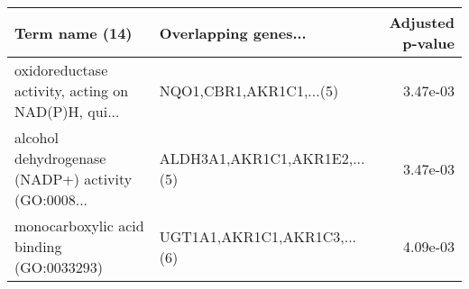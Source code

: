 \begin{tabular}{llr}
\toprule
                                    Term name (14) &         Overlapping genes... &  Adjusted p-value \\
\midrule
oxidoreductase activity, acting on NAD(P)H, qui... &      NQO1,CBR1,AKR1C1,...(5) &          3.47e-03 \\
alcohol dehydrogenase (NADP+) activity (GO:0008... & ALDH3A1,AKR1C1,AKR1E2,...(5) &          3.47e-03 \\
          monocarboxylic acid binding (GO:0033293) &  UGT1A1,AKR1C1,AKR1C3,...(6) &          4.09e-03 \\
\bottomrule
\end{tabular}
